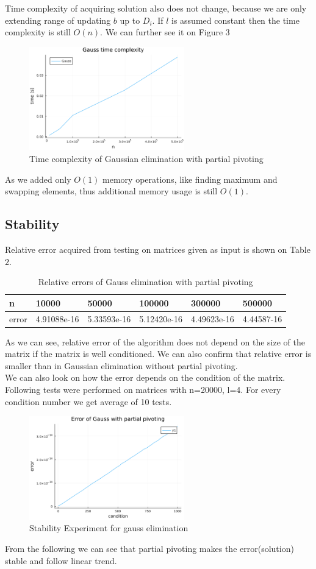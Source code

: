 \documentclass[11pt]{article}
\begin{document}
Time complexity of acquiring solution also does not change, because we are only extending range of updating $b$ up to $D_i$. 
If $l$ is assumed constant then the time complexity is still $O(n)$. We can further see it on Figure $3$
\begin{figure}[h]
    \centering
    \includegraphics[width=0.6\textwidth]{gauss_choice_time_complexity.png}
    \caption{Time complexity of Gaussian elimination with partial pivoting}
\end{figure}
As we added only $O(1)$ memory operations, like finding maximum and swapping elements, thus additional memory usage is still $O(1)$.
\subsection*{Stability}
Relative error acquired from testing on matrices given as input is shown on Table $2$.
\begin{table}[!ht]
    \centering
    \begin{tabular}{|l|l|l|l|l|l|}
    \hline
        n & 10000 & 50000 & 100000 & 300000 & 500000 \\ \hline
        error & 4.91088e-16 & 5.33593e-16 & 5.12420e-16 & 4.49623e-16 & 4.44587-16 \\ \hline
    \end{tabular}
    \caption{Relative errors of Gauss elimination with partial pivoting}
\end{table}
As we can see, relative error of the algorithm does not depend on the size of the matrix if the matrix is well conditioned. 
We can also confirm that relative error is smaller than in Gaussian elimination without partial pivoting.
\\We can also look on how the error depends on the condition of the matrix.
Following tests were performed on matrices with n=20000, l=4. For every condition number we get average of 10 tests.
\begin{figure}[h]
    \centering
    \includegraphics[width=0.6\textwidth]{gauss_pivot_error.png}
    \caption{Stability Experiment for gauss elimination}
\end{figure}
From the following we can see that partial pivoting makes the error(solution) stable and follow linear trend.
\end{document}
